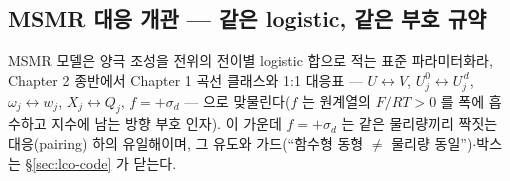 \subsection{MSMR 대응 개관 --- 같은 logistic, 같은 부호 규약}\label{sec:lco-preview}
MSMR 모델\cite{msmr_origin2017,msmr2024}은 양극 조성을 전위의 전이별 logistic 합으로 적는 표준
파라미터화라, Chapter 2 종반에서 Chapter 1 곡선 클래스와 1:1 대응표 --- $U\leftrightarrow V$,
$U_j^0\leftrightarrow U_j^{\,d}$, $\omega_j\leftrightarrow w_j$, $X_j\leftrightarrow Q_j$, $f=+\sigma_d$ ---
으로 맞물린다($f$ 는 원계열의 $F/RT>0$ 를 폭에 흡수하고 지수에 남는 방향 부호 인자). 이 가운데
$f=+\sigma_d$ 는 같은 물리량끼리 짝짓는 대응(pairing) 하의 유일해이며, 그 유도와 가드(``함수형 동형 $\ne$ 물리량
동일'')$\cdot$박스는 \S\ref{sec:lco-code} 가 닫는다.


